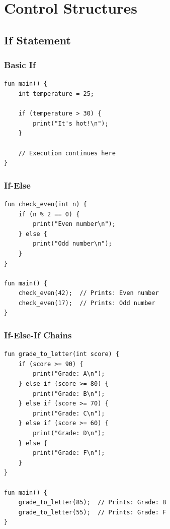 \documentclass[12pt,a4paper,oneside]{book}
\begin{document}
\chapter{Control Structures}

\section{If Statement}

\subsection{Basic If}

\begin{lstlisting}[style=algo, caption={Simple If Statement}]
fun main() {
    int temperature = 25;
    
    if (temperature > 30) {
        print("It's hot!\n");
    }
    
    // Execution continues here
}
\end{lstlisting}

\subsection{If-Else}

\begin{lstlisting}[style=algo, caption={If-Else Statement}]
fun check_even(int n) {
    if (n % 2 == 0) {
        print("Even number\n");
    } else {
        print("Odd number\n");
    }
}

fun main() {
    check_even(42);  // Prints: Even number
    check_even(17);  // Prints: Odd number
}
\end{lstlisting}

\subsection{If-Else-If Chains}

\begin{lstlisting}[style=algo, caption={Multiple Conditions}]
fun grade_to_letter(int score) {
    if (score >= 90) {
        print("Grade: A\n");
    } else if (score >= 80) {
        print("Grade: B\n");
    } else if (score >= 70) {
        print("Grade: C\n");
    } else if (score >= 60) {
        print("Grade: D\n");
    } else {
        print("Grade: F\n");
    }
}

fun main() {
    grade_to_letter(85);  // Prints: Grade: B
    grade_to_letter(55);  // Prints: Grade: F
}
\end{lstlisting}
\end{document}
